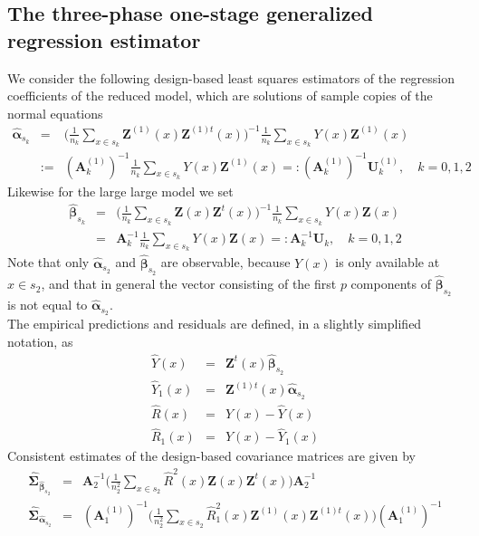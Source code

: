 \documentclass[a4paper,12pt,leqno, titlepage]{article}
\begin{document}
\subsection{The three-phase one-stage generalized regression estimator}\label{threephaseregest}
We consider the following design-based least squares estimators of the regression coefficients of the reduced model, which are solutions of sample copies of the normal equations
\begin{eqnarray}\label{coeff1}
\hat{\pmb{\alpha}}_{s_k} &=& \Big(\frac{1}{n_k}\sum_{x\in{s}_k}\pmb{Z}^{(1)}(x)\pmb{Z}^{(1)t}(x)
\Big)^{-1}\frac{1}{n_k}\sum_{x\in{s}_k}Y(x)\pmb{Z}^{(1)}(x)\nonumber\\
&:=&(\pmb{A}^{(1)}_k)^{-1}
\frac{1}{n_k}\sum_{x\in{s}_k}Y(x)\pmb{Z}^{(1)}(x)=:(\pmb{A}^{(1)}_k)^{-1}\pmb{U}^{(1)}_k,\quad  k=0,1,2
\end{eqnarray}
Likewise for the large large model we set
\begin{eqnarray}\label{coeff2}
\hat{\pmb{\beta}}_{s_k}&=&\Big(\frac{1}{n_k}\sum_{x\in{s}_k}\pmb{Z}(x)\pmb{Z}^t(x)
\Big)^{-1}\frac{1}{n_k}\sum_{x\in{s}_k}Y(x)\pmb{Z}(x)\nonumber \\
&=&\pmb{A}^{-1}_k\frac{1}{n_k}\sum_{x\in{s}_k}Y(x)\pmb{Z}(x)=:\pmb{A}^{-1}_k\pmb{U}_k,\quad k=0,1,2
\end{eqnarray}
 Note that only $\hat{\pmb{\alpha}}_{s_2}$ and $\hat{\pmb{\beta}}_{s_2}$ are observable, because $Y(x)$ is only available at $x\in{s_2}$, and that in general the vector consisting of the first $p$ components of $\hat{\pmb{\beta}}_{s_2}$ is not equal to $\hat{\pmb{\alpha}}_{s_2}$.\\
The empirical predictions and residuals are defined, in a slightly simplified notation, as
\begin{eqnarray*}
\hat{Y}(x)&=&\pmb{Z}^t(x)\hat{\pmb{\beta}}_{s_2} \\ \hat{Y}_1(x)&=&\pmb{Z}^{(1)t}(x)\hat{\pmb{\alpha}}_{s_2}\\
\hat{R}(x)&=&Y(x)-\hat{Y}(x)\\
\hat{R}_1(x)&=&Y(x)-\hat{Y}_1(x)
\end{eqnarray*}
Consistent estimates of the design-based covariance matrices are given by
\begin{eqnarray}\label{robustvar}
\hat{\pmb{\Sigma}}_{\hat{\pmb{\beta}}_{s_2}}&=&\pmb{A}_2^{-1}
\Big(\frac{1}{n_2^2}\sum_{x\in{s_2}}\hat{R}^2(x)\pmb{Z}(x)\pmb{Z}^t(x)\Big)\pmb{A}_2^{-1}\nonumber \\
\hat{\pmb{\Sigma}}_{\hat{\pmb{\alpha}}_{s_2}}&=&(\pmb{A}^{(1)}_1)^{-1}
\Big(\frac{1}{n_2^2}\sum_{x\in{s_2}}\hat{R}_1^2(x)\pmb{Z}^{(1)}(x)\pmb{Z}^{(1)t}(x)\Big)(\pmb{A}^{(1)}_1)^{-1}
\end{eqnarray}
\end{document}
